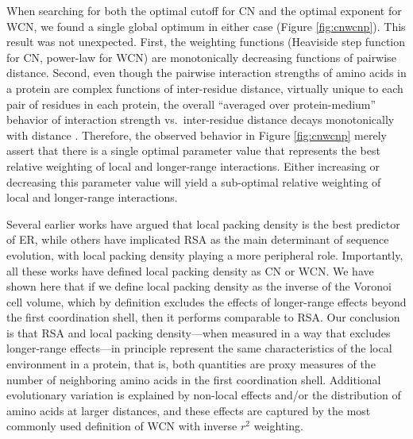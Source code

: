 \documentclass[12pt]{article}
\begin{document}
When searching for both the optimal cutoff for CN and the optimal exponent for WCN, we found a single global optimum in either case (Figure \ref{fig:cnwcnp}). This result was not unexpected. First, the weighting functions (Heaviside step function for CN, power-law for WCN) are monotonically decreasing functions of pairwise distance. Second, even though the pairwise interaction strengths of amino acids in a protein are complex functions of inter-residue distance, virtually unique to each pair of residues in each protein, the overall ``averaged over protein-medium'' behavior of interaction strength vs.\ inter-residue distance decays monotonically with distance \cite{dehouck_effective_2013,xia_correlation_2015,xia_multiscale_2015}. Therefore, the observed behavior in Figure \ref{fig:cnwcnp} merely assert that there is a single optimal parameter value that represents the best relative weighting of local and longer-range interactions. Either increasing or decreasing this parameter value will yield a sub-optimal relative weighting of local and longer-range interactions.

    Several earlier works \cite{yeh_local_2014, huang_mechanistic_2014} have argued that local packing density is the best predictor of ER, while others \cite{franzosa_structural_2009, shahmoradi_predicting_2014} have implicated RSA as the main determinant of sequence evolution, with local packing density playing a more  peripheral role. Importantly, all these works have defined local packing density as CN or WCN. We have shown here that if we define local packing density as the inverse of the Voronoi cell volume, which by definition excludes the effects of longer-range effects beyond the first coordination shell, then it performs comparable to RSA.  Our conclusion is that RSA and local packing density---when measured in a way that excludes longer-range effects---in principle represent the same characteristics of the local environment in a protein, that is, both quantities are proxy measures of the number of neighboring amino acids in the first coordination shell. Additional evolutionary variation is explained by non-local effects and/or the distribution of amino acids at larger distances, and these effects are captured by the most commonly used definition of WCN with inverse $r^2$ weighting.
\end{document}
